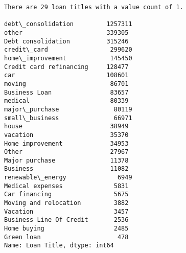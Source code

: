 \documentclass[11pt]{article}
\begin{document}
    \begin{Verbatim}[commandchars=\\\{\},fontsize=\footnotesize]
There are 29 loan titles with a value count of 1.

debt\_consolidation         1257311
other                       339305
Debt consolidation          315246
credit\_card                 299620
home\_improvement            145450
Credit card refinancing     128477
car                         108601
moving                       86701
Business Loan                83657
medical                      80339
major\_purchase               80119
small\_business               66971
house                        38949
vacation                     35370
Home improvement             34953
Other                        27967
Major purchase               11378
Business                     11082
renewable\_energy              6949
Medical expenses              5831
Car financing                 5675
Moving and relocation         3882
Vacation                      3457
Business Line Of Credit       2536
Home buying                   2485
Green loan                     478
Name: Loan Title, dtype: int64

    \end{Verbatim}
\end{document}
